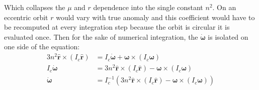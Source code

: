 \documentclass[titlepage]{article}
\begin{document}
Which collapses the $\mu$ and $r$ dependence into the single constant $n^2$. On an eccentric orbit $r$ would vary with true anomaly and this coefficient would have to be recomputed at every integration step because the orbit is circular it is evaluated once. Then for the sake of numerical integration, the $\dot{\boldsymbol{\omega}}$ is isolated on one side of the equation:
\begin{equation}
	\begin{split}
		3n^2\hat{\boldsymbol{r}}\times\left(I_c\hat{\boldsymbol{r}}\right)&=I_c\dot{\boldsymbol{\omega}}+\boldsymbol{\omega}\times\left(I_c\boldsymbol{\omega}\right) \\
		I_c\dot{\boldsymbol{\omega}}&=3n^2\hat{\boldsymbol{r}}\times\left(I_c\hat{\boldsymbol{r}}\right)-\boldsymbol{\omega}\times\left(I_c\boldsymbol{\omega}\right) \\
		\dot{\boldsymbol{\omega}}&=I_c^{-1}\left(3n^2\hat{\boldsymbol{r}}\times\left(I_c\hat{\boldsymbol{r}}\right)-\boldsymbol{\omega}\times\left(I_c\boldsymbol{\omega}\right)\right) \\
	\end{split}
\end{equation}
\end{document}

